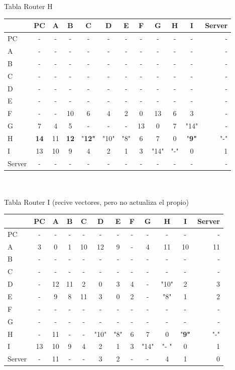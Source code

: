 \documentclass{article}
\begin{document}
\\
\\
Tabla Router H \\
\begin{tabular}{l*{10}{c}r}
              & PC & A & B & C & D & E & F & G & H & I & Server \\
\hline
PC             & - & - & - & - & - & - & - & - & - & - & - \\
A              & - & - & - & - & - & - & - & - & - & - & - \\
B              & - & - & - & - & - & - & - & - & - & - & - \\
C              & - & - & - & - & - & - & - & - & - & - & - \\
D              & - & - & - & - & - & - & - & - & - & - & - \\
E              & - & - & - & - & - & - & - & - & - & - & - \\
F              & - & - & 10 & 6 & 4 & 2 & 0 & 13 & 6 & 3 & -\\
G              & 7 & 4 & 5 & - & - & - & 13 & 0 & 7 & "14" & -\\
H              &\bf{14}& 11 &\bf{12}&"\bf{12}"& "10" & "8" & 6 & 7 & 0 &"\bf{9}" & "-"\\
I              & 13 & 10 & 9 & 4 & 2 & 1 & 3 & "14" & "-" & 0 & 1\\
Server         & - & - & - & - & - & - & - & - & - & - & - \\

\end{tabular}
\\
\\
Tabla Router I (recive vectores, pero no actualiza el propio)\\
\begin{tabular}{l*{10}{c}r}
              & PC & A & B & C & D & E & F & G & H & I & Server \\
\hline
PC             & - & - & - & - & - & - & - & - & - & - & -\\
A              & 3 & 0 & 1 & 10 & 12 & 9 & - & 4 & 11 & 10 & 11 \\
B              & - & - & - & - & - & - & - & - & - & - & -\\
C              & - & - & - & - & - & - & - & - & - & - & -\\
D              & - & 12 & 11 & 2 & 0 & 3 & 4 & - & "10" & 2 & 3\\
E              & - & 9 & 8 & 11 & 3 & 0 & 2 & - & "8" & 1 & 2\\
F              & - & - & - & - & - & - & - & - & - & - & -\\
G              & - & - & - & - & - & - & - & - & - & - & -\\
H              & - & 11 & - & - & "10" & "8" & 6 & 7 & 0 & "\bf{9}" & "-"\\
I              & 13 & 10 & 9 & 4 & 2 & 1 & 3 & "14" & "- " & 0 & 1\\
Server         & - & 11 & - & - & 3 & 2 & - & - & 4 & 1 & 0\\

\end{tabular}
\end{document}
